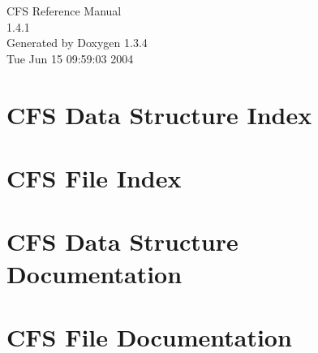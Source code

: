 \documentclass[a4paper]{book}
\begin{document}
\begin{titlepage}
\vspace*{7cm}
\begin{center}
{\Large CFS Reference Manual\\[1ex]\large 1.4.1 }\\
\vspace*{1cm}
{\large Generated by Doxygen 1.3.4}\\
\vspace*{0.5cm}
{\small Tue Jun 15 09:59:03 2004}\\
\end{center}
\end{titlepage}
\clearemptydoublepage
{}
\tableofcontents
\clearemptydoublepage
{}
\chapter{CFS Data Structure Index}

\chapter{CFS File Index}

\chapter{CFS Data Structure Documentation}










\chapter{CFS File Documentation}

































\printindex
\end{document}
